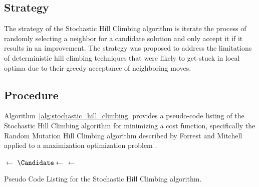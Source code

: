 \subsection{Strategy}
The strategy of the Stochastic Hill Climbing algorithm is iterate the process of randomly selecting a neighbor for a candidate solution and only accept it if it results in an improvement.
The strategy was proposed to address the limitations of deterministic hill climbing techniques that were likely to get stuck in local optima due to their greedy acceptance of neighboring moves.

\subsection{Procedure}
Algorithm~\ref{alg:stochastic_hill_climbing} provides a pseudo-code listing of the Stochastic Hill Climbing algorithm for minimizing a cost function, specifically the Random Mutation Hill Climbing algorithm described by Forrest and Mitchell applied to a maximization optimization problem \cite{Forrest1993}.

\begin{algorithm}[htp]
	\SetLine
	\KwIn{\NumIterations, \ProblemSize}
	\KwOut{\Current}
	\Current $\leftarrow$ \RandomSolution{\ProblemSize}\;
	 {
		$\Candidate \leftarrow$ \RandomNeighbor{\Current}\;		
		\If{\Cost{\Candidate} $\geq$ \Cost{\Current}} {
			\Current $\leftarrow$ \Candidate\;
		}
	}
	\Return{\Current}\;
	\caption{Pseudo Code Listing for the Stochastic Hill Climbing algorithm.}
	\label{alg:stochastic_hill_climbing}
\end{algorithm}

